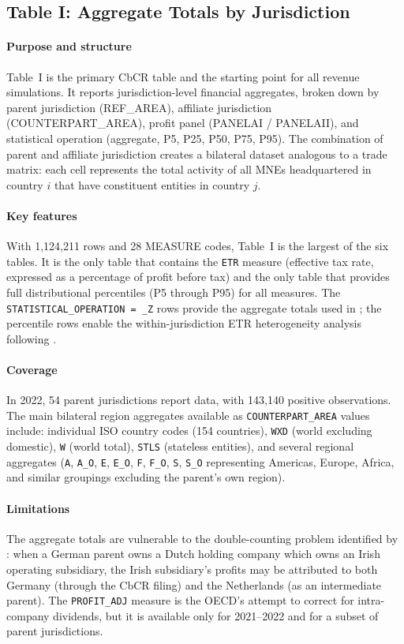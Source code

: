 \documentclass[11pt,a4paper]{article}
\newcommand{\code}[1]{\texttt{#1}}
\begin{document}
\subsection{Table I: Aggregate Totals by Jurisdiction}\label{sec:table1}

\paragraph{Purpose and structure}
Table~I is the primary CbCR table and the starting point for all revenue simulations. It reports jurisdiction-level financial aggregates, broken down by parent jurisdiction (REF\_AREA), affiliate jurisdiction (COUNTERPART\_AREA), profit panel (PANELAI / PANELAII), and statistical operation (aggregate, P5, P25, P50, P75, P95). The combination of parent and affiliate jurisdiction creates a bilateral dataset analogous to a trade matrix: each cell represents the total activity of all MNEs headquartered in country $i$ that have constituent entities in country $j$.

\paragraph{Key features}
With 1,124,211 rows and 28 MEASURE codes, Table~I is the largest of the six tables. It is the only table that contains the \code{ETR} measure (effective tax rate, expressed as a percentage of profit before tax) and the only table that provides full distributional percentiles (P5 through P95) for all measures. The \code{STATISTICAL\_OPERATION = \_Z} rows provide the aggregate totals used in \citet{barake2022}; the percentile rows enable the within-jurisdiction ETR heterogeneity analysis following \citet{hugger2025}.

\paragraph{Coverage}
In 2022, 54 parent jurisdictions report data, with 143,140 positive observations. The main bilateral region aggregates available as \code{COUNTERPART\_AREA} values include: individual ISO country codes (154 countries), \code{WXD} (world excluding domestic), \code{W} (world total), \code{STLS} (stateless entities), and several regional aggregates (\code{A}, \code{A\_O}, \code{E}, \code{E\_O}, \code{F}, \code{F\_O}, \code{S}, \code{S\_O} representing Americas, Europe, Africa, and similar groupings excluding the parent's own region).

\paragraph{Limitations}
The aggregate totals are vulnerable to the double-counting problem identified by \citet{blouin2023}: when a German parent owns a Dutch holding company which owns an Irish operating subsidiary, the Irish subsidiary's profits may be attributed to both Germany (through the CbCR filing) and the Netherlands (as an intermediate parent). The \code{PROFIT\_ADJ} measure is the OECD's attempt to correct for intra-company dividends, but it is available only for 2021--2022 and for a subset of parent jurisdictions.
\end{document}
